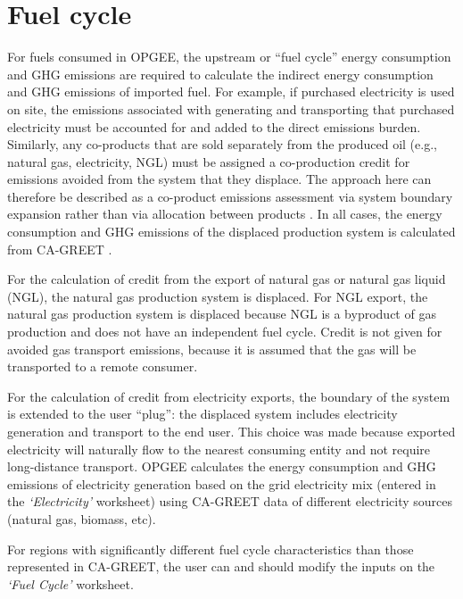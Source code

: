 \documentclass[11pt]{report}
\newcommand{\sheet}[1]{\textit{`{#1}'}}
\begin{document}
\section{Fuel cycle} \label{sec:fuel_cycle}

For fuels consumed in OPGEE, the upstream or ``fuel cycle'' energy consumption and GHG emissions are required to calculate the indirect energy consumption and GHG emissions of imported fuel. For example, if purchased electricity is used on site, the emissions associated with generating and transporting that purchased electricity must be accounted for and added to the direct emissions burden. Similarly, any co-products that are sold separately from the produced oil (e.g., natural gas, electricity, NGL) must be assigned a co-production credit for emissions avoided from the system that they displace. The approach here can therefore be described as a co-product emissions assessment via system boundary expansion rather than via allocation between products \cite{ISO2006a, ISO2006b}. In all cases, the energy consumption and GHG emissions of the displaced production system is calculated from CA-GREET \cite{Wang2009}. 

For the calculation of credit from the export of natural gas or natural gas liquid (NGL), the natural gas production system is displaced. For NGL export, the natural gas production system is displaced because NGL is a byproduct of gas production and does not have an independent fuel cycle. Credit is not given for avoided gas transport emissions, because it is assumed that the gas will be transported to a remote consumer.

For the calculation of credit from electricity exports, the boundary of the system is extended to the user ``plug'': the displaced system includes electricity generation and transport to the end user. This choice was made because exported electricity will naturally flow to the nearest consuming entity and not require long-distance transport. OPGEE calculates the energy consumption and GHG emissions of electricity generation based on the grid electricity mix (entered in the \sheet{Electricity} worksheet) using CA-GREET data of different electricity sources (natural gas, biomass, etc).

For regions with significantly different fuel cycle characteristics than those represented in CA-GREET, the user can and should modify the inputs on the \sheet{Fuel Cycle} worksheet.

\newpage
\end{document}
